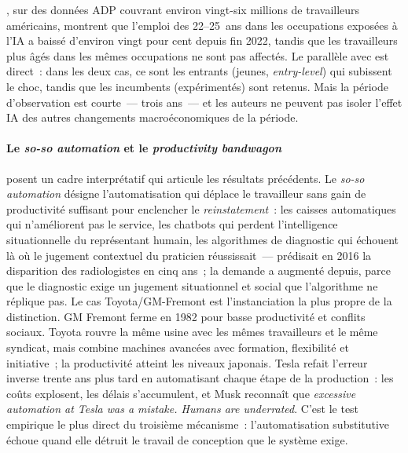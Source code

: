 \textcite{brynjolfsson_canaries_2025}, sur des données ADP couvrant environ vingt-six millions de travailleurs américains, montrent que l'emploi des 22--25~ans dans les occupations exposées à l'IA a baissé d'environ vingt pour cent depuis fin 2022, tandis que les travailleurs plus âgés dans les mêmes occupations ne sont pas affectés. Le parallèle avec \textcite{feigenbaum_answering_2024} est direct~: dans les deux cas, ce sont les entrants (jeunes, \emph{entry-level}) qui subissent le choc, tandis que les incumbents (expérimentés) sont retenus. Mais la période d'observation est courte~--- trois ans~--- et les auteurs ne peuvent pas isoler l'effet IA des autres changements macroéconomiques de la période.

\paragraph{Le \emph{so-so automation} et le \emph{productivity bandwagon}}

\textcite{acemoglu_power_2023} posent un cadre interprétatif qui articule les résultats précédents. Le \emph{so-so automation} désigne l'automatisation qui déplace le travailleur sans gain de productivité suffisant pour enclencher le \emph{reinstatement}~: les caisses automatiques qui n'améliorent pas le service, les chatbots qui perdent l'intelligence situationnelle du représentant humain, les algorithmes de diagnostic qui échouent là où le jugement contextuel du praticien réussissait~--- \textcite{hinton_2016} prédisait en 2016 la disparition des radiologistes en cinq ans~; la demande a augmenté depuis, parce que le diagnostic exige un jugement situationnel et social que l'algorithme ne réplique pas. Le cas Toyota/GM-Fremont est l'instanciation la plus propre de la distinction. GM Fremont ferme en 1982 pour basse productivité et conflits sociaux. Toyota rouvre la même usine avec les mêmes travailleurs et le même syndicat, mais combine machines avancées avec formation, flexibilité et initiative~; la productivité atteint les niveaux japonais. Tesla refait l'erreur inverse trente ans plus tard en automatisant chaque étape de la production~: les coûts explosent, les délais s'accumulent, et Musk reconnaît que \og \emph{excessive automation at Tesla was a mistake. Humans are underrated}\fg{}. C'est le test empirique le plus direct du troisième mécanisme~: l'automatisation substitutive échoue quand elle détruit le travail de conception que le système exige.

